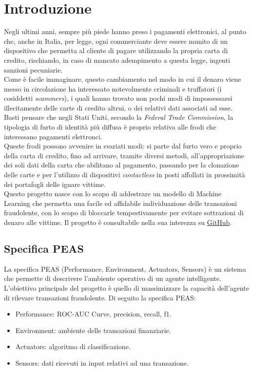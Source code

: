 \documentclass[]{article}
\begin{document}
\section{Introduzione}
    Negli ultimi anni, sempre più piede hanno preso i pagamenti elettronici, al punto che, anche in Italia, per legge, ogni commerciante deve essere munito di un dispositivo che permetta al cliente di pagare utilizzando la propria carta di credito, rischiando, in caso di mancato adempimento a questa legge, ingenti sanzioni pecuniarie.\\
    Come è facile immaginare, questo cambiamento nel modo in cui il denaro viene messo in circolazione ha interessato notevolmente criminali e truffatori (i cosiddetti \textit{scammers}), i quali hanno trovato non pochi modi di impossessarsi illecitamente delle carte di credito altrui, o dei relativi dati associati ad esse.
    Basti pensare che negli Stati Uniti, secondo la \textit{Federal Trade Commission}, la tipologia di furto di identità più diffusa è proprio relativa alle frodi che interessano pagamenti elettronci.\\
    Queste frodi possono avvenire in svariati modi: si parte dal furto vero e proprio della carta di credito, fino ad arrivare, tramite diversi metodi, all'appropriazione dei soli dati della carta che abilitano al pagamento, passando per la clonazione delle carte e per l'utilizzo di dispositivi \textit{contactless} in posti affollati in prossimità dei portafogli delle ignare vittime.\\
    Questo progetto nasce con lo scopo di addestrare un modello di Machine Learning che permetta una facile ed affidabile individuazione delle transazioni fraudolente, con lo scopo di bloccarle tempestivamente per evitare sottrazioni di denaro alle vittime.
    Il progetto è consultabile nella sua interezza su \href{https://github.com/marcosantoriello/CCFDetector}{GitHub}.

    \subsection{Specifica PEAS}
        La specifica PEAS (Performance, Environment, Actuators, Sensors) è un sistema che permette di descrivere l'ambiente operativo di un agente intelligente. L'obiettivo principale del progetto è quello di massimizzare la capacità dell'agente di rilevare transazioni fraudolente. Di seguito la specifica PEAS:
        \begin{itemize}
            \item Performance: ROC-AUC Curve, precision, recall, f1.
            \item Environment: ambiente delle transazioni finanziarie.
            \item Actuators: algoritmo di classificazione.
            \item Sensors: dati ricevuti in input relativi ad una transazione.
        \end{itemize}
\end{document}
